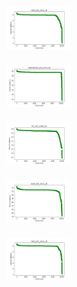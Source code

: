 \begin{figure}[H]
    \hfill
    \begin{subfigure}
        \centering
        \includegraphics[width=0.234\textwidth]{img/HS-LS-v2/rand_set_const_20_277451237_cost.png}
    \end{subfigure}
    \hfill
    \begin{subfigure}
        \centering
        \includegraphics[width=0.234\textwidth]{img/HS-LS-v2/newthyroid_set_const_20_277451237_cost.png}
    \end{subfigure}
    \hfill
    \begin{subfigure}
        \centering
        \includegraphics[width=0.234\textwidth]{img/HS-LS-v2/iris_set_const_20_49258669_cost.png}
    \end{subfigure}
    \hfill
    \begin{subfigure}
        \centering
        \includegraphics[width=0.234\textwidth]{img/HS-LS-v2/ecoli_set_const_20_49258669_cost.png}
    \end{subfigure}
    \hfill
    \begin{subfigure}
        \centering
        \includegraphics[width=0.234\textwidth]{img/HS-LS-v2/rand_set_const_20_49258669_cost.png}
    \end{subfigure}
    \hfill
    \begin{subfigure}

\end{subfigure}
\end{figure}
